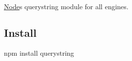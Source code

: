 \href{http://travis-ci.org/mike-spainhower/querystring}{\tt }

\href{http://ci.testling.com/mike-spainhower/querystring}{\tt }

\mbox{\hyperlink{classNode}{Node}}\textquotesingle{}s querystring module for all engines.

\subsection*{Install}

\begin{DoxyVerb}npm install querystring\end{DoxyVerb}
 